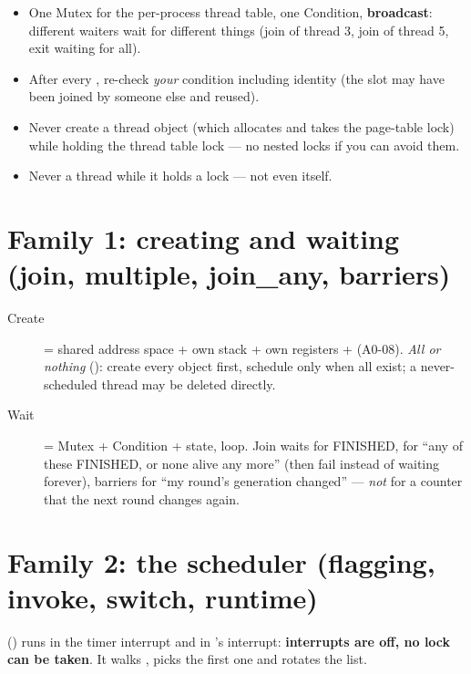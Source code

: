 \begin{lockbox}
\begin{itemize}
\item One Mutex for the per-process thread table, one Condition, \textbf{broadcast}: different
  waiters wait for different things (join of thread 3, join of thread 5, exit waiting for all).
\item After every , re-check \emph{your} condition including identity (the slot may
  have been joined by someone else and reused).
\item Never create a thread object (which allocates and takes the page-table lock) while holding
  the thread table lock --- no nested locks if you can avoid them.
\item Never  a thread while it holds a lock --- not even itself.
\end{itemize}
\end{lockbox}

\section{Family 1: creating and waiting (join, multiple, join\_any, barriers)}

\begin{description}
\item[Create] = shared address space + own stack + own registers + 
  (A0-08). \emph{All or nothing} (): create every object first,
  schedule only when all exist; a never-scheduled thread may be deleted directly.
\item[Wait] = Mutex + Condition + state,  loop. Join waits for FINISHED,
   for ``any of these FINISHED, or none alive any more'' (then fail instead of
  waiting forever), barriers for ``my round's generation changed'' --- \emph{not} for a counter that
  the next round changes again.
\end{description}

\section{Family 2: the scheduler (flagging, invoke, switch, runtime)}

 () runs in the timer
interrupt and in 's interrupt: \textbf{interrupts are off, no lock can be taken}.
It walks , picks the first  one and rotates the list.

